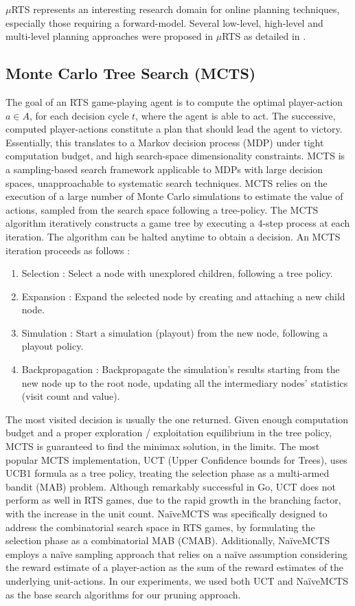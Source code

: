 \documentclass[conference]{IEEEtran}
\newcommand{\mRTS}{$\mu$RTS}
\begin{document}
\mRTS{} represents an interesting research domain for online planning techniques, especially those requiring a forward-model. Several low-level, high-level and multi-level planning approaches were proposed in \mRTS{} as detailed in \cite{ouessai_online_2019}.

\subsection{Monte Carlo Tree Search (MCTS)}

The goal of an RTS game-playing agent is to compute the optimal player-action $a \in A$, for each decision cycle $t$, where the agent is able to act. The successive, computed player-actions constitute a plan that should lead the agent to victory. Essentially, this translates to a Markov decision process (MDP) under tight computation budget, and high search-space dimensionality constraints. MCTS is a sampling-based search framework applicable to MDPs with large decision spaces, unapproachable to systematic search techniques. MCTS relies on the execution of a large number of Monte Carlo simulations to estimate the value of actions, sampled from the search space following a tree-policy. The MCTS algorithm iteratively constructs a game tree by executing a 4-step process at each iteration. The algorithm can be halted anytime to obtain a decision. An MCTS iteration proceeds as follows : 

\begin{enumerate}
\item Selection : Select a node with unexplored children, following a tree policy.
\item Expansion : Expand the selected node by creating and attaching a new child node.
\item Simulation : Start a simulation (playout) from the new node, following a playout policy.
\item Backpropagation : Backpropagate the simulation's results starting from the new node up to the root node, updating all the intermediary nodes' statistics (visit count and value).
\end{enumerate}

The most visited decision is usually the one returned. Given enough computation budget and a proper exploration / exploitation equilibrium in the tree policy, MCTS is guaranteed to find the minimax solution, in the limits. The most popular MCTS implementation, UCT (Upper Confidence bounds for Trees), uses UCB1 formula as a tree policy, treating the selection phase as a multi-armed bandit (MAB) problem. Although remarkably successful in Go, UCT does not perform as well in RTS games, due to the rapid growth in the branching factor, with the increase in the unit count. NaïveMCTS was specifically designed to address the combinatorial search space in RTS games, by formulating the selection phase as a combinatorial MAB (CMAB). Additionally, NaïveMCTS employs a naïve sampling approach that relies on a naïve assumption considering the reward estimate of a player-action as the sum of the reward estimates of the underlying unit-actions. In our experiments, we used both UCT and NaïveMCTS as the base search algorithms for our pruning approach.
\end{document}
